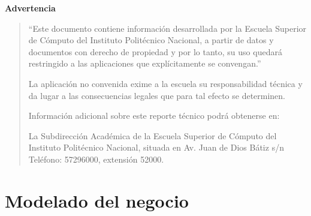 \documentclass[10pt]{book}
\author{Escuela Superior de Cómputo (ESCOM)}
\begin{document}
    \frontmatter
        \maketitle
        \makeDocInfo
        \makeObservaciones
        \makeFirmas
        
        \thispagestyle{empty}
        \begin{center}
            \textbf{\large Advertencia}
        \end{center}
        
        \vspace{0.5cm}
        
        \begin{quote}
        \noindent
        ``Este documento contiene información desarrollada por la Escuela Superior de Cómputo del Instituto Politécnico Nacional, a partir de datos y documentos con derecho de propiedad y por lo tanto, su uso quedará restringido a las aplicaciones que explícitamente se convengan.''
        
        \vspace{0.3cm}
        
        \noindent
        La aplicación no convenida exime a la escuela su responsabilidad técnica y da lugar a las consecuencias legales que para tal efecto se determinen.
        
        \vspace{0.5cm}
        
        \noindent
        Información adicional sobre este reporte técnico podrá obtenerse en:
        
        \vspace{0.3cm}
        
        \noindent
        La Subdirección Académica de la Escuela Superior de Cómputo del Instituto Politécnico Nacional, situada en Av. Juan de Dios Bátiz s/n Teléfono: 57296000, extensión 52000.
        \end{quote}
        
        \clearpage
        
        \tableofcontents
        \listoffigures
        \listoftables
    \mainmatter
    


    \part{Modelado del negocio}
    \label{part:modeloNegocio}
        
        
        
        
        
        
        
        
        

        
\backmatter
    \makeReferenciasCruzadas
\end{document}
